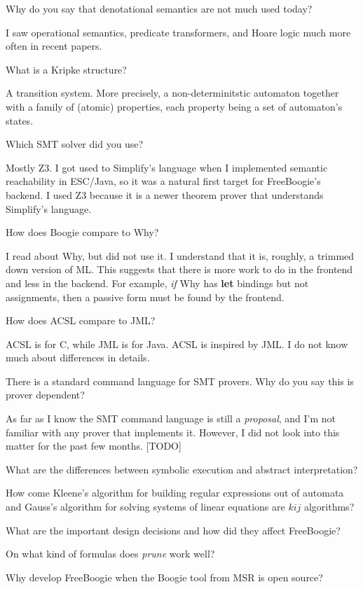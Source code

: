 \Q Why do you say that denotational semantics are not much used today?

\A I saw operational semantics, predicate transformers, and Hoare logic
much more often in recent papers.

\Q What is a Kripke structure?

\A A transition system. More precisely, a non-determinitstic automaton
together with a family of (atomic) properties, each property being a set of
automaton's states.

\Q Which SMT solver did you use?

\A Mostly Z3. I got used to Simplify's language when I implemented semantic
reachability in ESC/Java, so it was a natural first target for FreeBoogie's
backend. I used Z3 because it is a newer theorem prover that understands
Simplify's language.

\Q How does Boogie compare to Why?

\A I read about Why, but did not use it. I understand that it is, roughly,
a trimmed down version of ML\null. This suggests that there is more work to
do in the frontend and less in the backend. For example, {\it if\/} Why has
{\bf let} bindings but not assignments, then a passive form must be found
by the frontend.

\Q How does ACSL compare to JML?

\A ACSL is for C, while JML is for Java. ACSL is inspired by JML.
I do not know much about differences in details.

\Q There is a standard command language for SMT provers. Why do you say
this is prover dependent?

\A As far as I know the SMT command language is still a {\it proposal}, and
I'm not familiar with any prover that implements it. However, I did not
look into this matter for the past few months. [TODO]

\Q What are the differences between symbolic execution and abstract
interpretation?

\Q How come Kleene's algorithm for building regular expressions out of
automata and Gauss's algorithm for solving systems of linear equations are
$kij$ algorithms?

\Q What are the important design decisions and how did they affect
FreeBoogie?

\Q On what kind of formulas does {\it prune\/} work well?

\Q Why develop FreeBoogie when the Boogie tool from MSR is open source?

